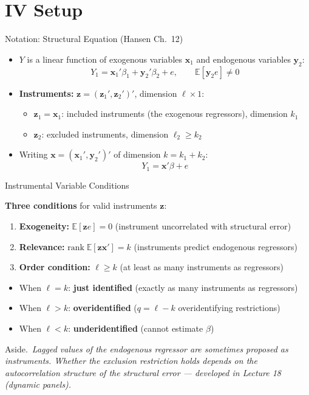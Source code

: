 \documentclass[aspectratio=169, handout]{beamer}
\numberwithin{equation}{section}
\begin{document}
\section{IV Setup}

\begin{frame}{Notation: Structural Equation (Hansen Ch.\ 12)}
\begin{itemize}
\item $Y$ is a linear function of exogenous variables $\bm{x}_1$ and endogenous variables $\bm{y}_2$:
$$Y_1=\bm{x}_1'\beta_1+\bm{y}_2'\beta_2+e, \qquad \mathbb{E}[\bm{y}_2 e]\neq 0$$
\item \textbf{Instruments:} $\bm{z}=(\bm{z}_1', \bm{z}_2')'$, dimension $\ell\times 1$:
\begin{itemize}
\item $\bm{z}_1 = \bm{x}_1$: included instruments (the exogenous regressors), dimension $k_1$
\item $\bm{z}_2$: excluded instruments, dimension $\ell_2 \geq k_2$
\end{itemize}
\item Writing $\bm{x}=(\bm{x}_1', \bm{y}_2')'$ of dimension $k=k_1+k_2$:
$$Y_1 = \bm{x}'\beta + e$$
\end{itemize}
\end{frame}


\begin{frame}{Instrumental Variable Conditions}
\begin{tcolorbox}[colback=blue!5, colframe=blue!50]
\textbf{Three conditions} for valid instruments $\bm{z}$:
\begin{enumerate}
\item \textbf{Exogeneity:}  $\mathbb{E}[\bm{z}e]=0$ \quad (instrument uncorrelated with structural error)
\item \textbf{Relevance:}  $\text{rank}\;\mathbb{E}[\bm{z}\bm{x}']=k$ \quad (instruments predict endogenous regressors)
\item \textbf{Order condition:}  $\ell\geq k$ \quad (at least as many instruments as regressors)
\end{enumerate}
\end{tcolorbox}
\vspace{0.2cm}
\begin{itemize}
\item When $\ell=k$: \textbf{just identified} (exactly as many instruments as regressors)
\item When $\ell>k$: \textbf{overidentified} ($q=\ell-k$ overidentifying restrictions)
\item When $\ell<k$: \textbf{underidentified} (cannot estimate $\beta$)
\end{itemize}
\medskip
\small\alert{Aside.}\, \emph{Lagged values of the endogenous regressor are sometimes proposed as instruments.  Whether the exclusion restriction holds depends on the autocorrelation structure of the structural error --- developed in Lecture 18 (dynamic panels).}
\end{frame}
\end{document}
